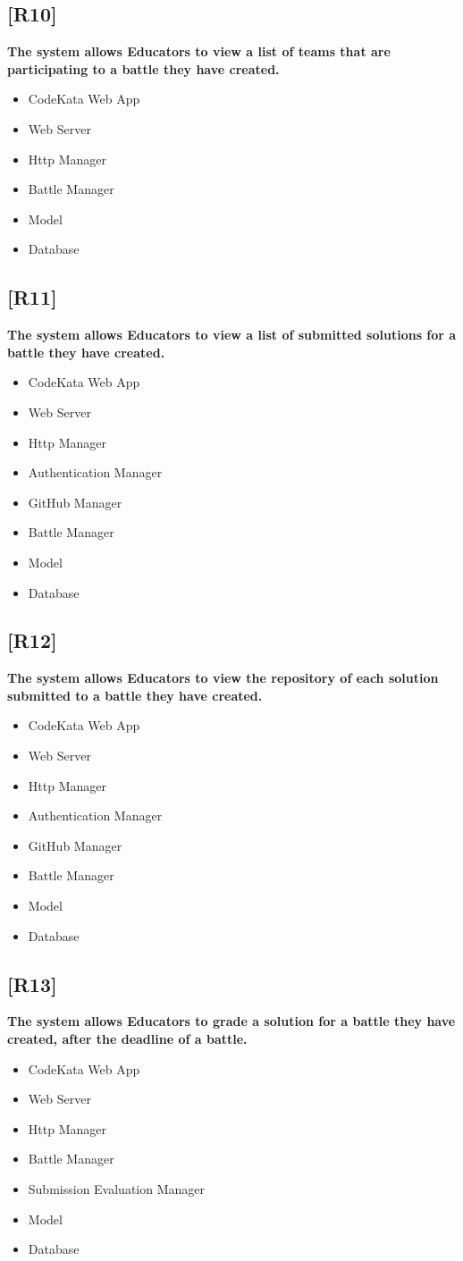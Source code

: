 \documentclass{article}
\begin{document}
\subsection{[R10]}
\textbf{ The system allows Educators to view a list of teams that are participating to a battle they have created.}
\begin{itemize}
\item CodeKata Web App
\item Web Server
\item Http Manager
\item Battle Manager
\item Model
\item Database
\end{itemize}
\subsection{[R11]}
\textbf{ The system allows Educators to view a list of submitted solutions for a battle they have created.}
\begin{itemize}
\item CodeKata Web App
\item Web Server
\item Http Manager
\item Authentication Manager
\item GitHub Manager
\item Battle Manager
\item Model
\item Database
\end{itemize}
\subsection{[R12]}
\textbf{ The system allows Educators to view the repository of each solution submitted to a battle they have created.}
\begin{itemize}
\item CodeKata Web App
\item Web Server
\item Http Manager
\item Authentication Manager
\item GitHub Manager
\item Battle Manager
\item Model
\item Database
\end{itemize}
\subsection{[R13]}
\textbf{ The system allows Educators to grade a solution for a battle they have created, after the deadline of a battle.}
\begin{itemize}
\item CodeKata Web App
\item Web Server
\item Http Manager
\item Battle Manager
\item Submission Evaluation Manager
\item Model
\item Database
\end{itemize}
\end{document}
